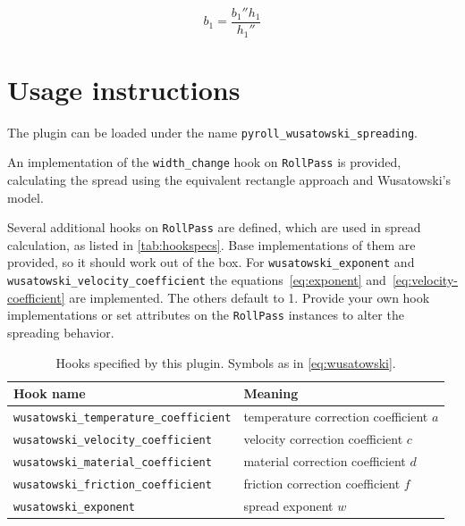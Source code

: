 \documentclass[11pt]{PyRollDocs}
\begin{document}
    \[
        b_1 = \frac{b_1'' h_1}{h_1''}
    \]


    \section{Usage instructions}\label{sec:usage-instructions}

    The plugin can be loaded under the name \texttt{pyroll\_wusatowski\_spreading}.

    An implementation of the \lstinline{width_change} hook on \lstinline{RollPass} is provided,
    calculating the spread using the equivalent rectangle approach and Wusatowski's model.

    Several additional hooks on \lstinline{RollPass} are defined, which are used in spread calculation, as listed in \autoref{tab:hookspecs}.
    Base implementations of them are provided, so it should work out of the box.
    For \lstinline{wusatowski_exponent} and \lstinline{wusatowski_velocity_coefficient} the equations~\ref{eq:exponent} and~\ref{eq:velocity-coefficient} are implemented.
    The others default to \num{1}.
    Provide your own hook implementations or set attributes on the \lstinline{RollPass} instances to alter the spreading behavior.

    \begin{table}
        \centering
        \caption{Hooks specified by this plugin. Symbols as in \autoref{eq:wusatowski}.}
        \label{tab:hookspecs}
        \begin{tabular}{ll}
            \toprule
            Hook name                                     & Meaning                                \\
            \midrule
            \texttt{wusatowski\_temperature\_coefficient} & temperature correction coefficient $a$ \\
            \texttt{wusatowski\_velocity\_coefficient}    & velocity correction coefficient $c$    \\
            \texttt{wusatowski\_material\_coefficient}    & material correction coefficient $d$    \\
            \texttt{wusatowski\_friction\_coefficient}    & friction correction coefficient $f$    \\
            \texttt{wusatowski\_exponent}                 & spread exponent $w$                    \\
            \bottomrule
        \end{tabular}
    \end{table}
\end{document}
